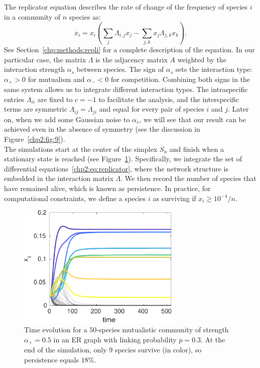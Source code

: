 The replicator equation describes the rate of change of the frequency of species $i$ in a community of $n$ species as:
\begin{equation}
    \dot{x_i} = x_i \left( \sum_j \Lambda_{i,j} x_j - \sum_{j,k} x_j \Lambda_{j,k} x_k \right).
    \label{chp2:eq:replicator}
\end{equation}
See Section~\ref{chp:methods:repli} for a complete description of the equation. In our particular case, the matrix $\Lambda$ is the adjacency matrix $A$ weighted by the interaction strength $\alpha_s$ between species. The sign of $\alpha_s$ sets the interaction type: $\alpha_+ > 0 $ for mutualism and $\alpha_- < 0 $ for competition. Combining both signs in the same system allows us to integrate different interaction types. The intraspecific entries $\Lambda_{ii}$ are fixed to $c = -1$ to facilitate the analysis, and the interspecific terms are symmetric  $\Lambda_{ij} = \Lambda_{ji}$ and equal for every pair of species  $i$ and $j$. Later on, when we add some Gaussian noise to $\alpha_s$, we will see that our result can be achieved even in the absence of symmetry (see the discussion in Figure~\ref{chp2:fig:9}). \\

The simulations start at the center of the simplex $S_n$ and finish when a stationary state is reached (see Figure~\ref{chp2:fig:3}). Specifically, we integrate the set of differential equations~\ref{chp2:eq:replicator}, where the network structure is embedded in the interaction matrix $\Lambda$. We then record the number of species that have remained alive, which is known as persistence. In practice, for computational constraints, we define a species $i$ as surviving if $x_i \geq 10^{-4}/n$. \\

\begin{figure}
    \centering
    \includegraphics[width=0.7\textwidth]{figures/chp2/fig_3.pdf}
    \caption[Time evolution of mutualistic community]{Time evolution for a $50$-species mutualistic community of strength $\alpha_+ = 0.5$ in an ER graph with linking probability $p = 0.3$. At the end of the simulation, only $9$ species survive (in color), so persistence equals $18\%$.}
    \label{chp2:fig:3}
\end{figure}

